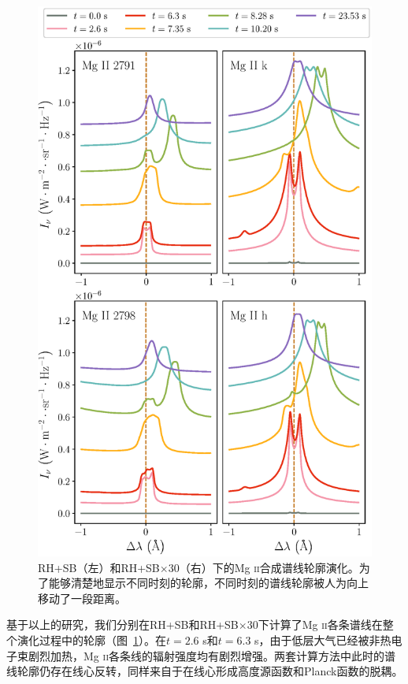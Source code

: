 \begin{figure}[htbp]
\begin{minipage}[t]{0.48\linewidth}
	\includegraphics[width=0.95\linewidth]{figs/5F11_spectra_2_mg}
	\end{minipage}
	\caption{RH+SB（左）和RH+SB$\times30$（右）下的Mg \textsc{ii}合成谱线轮廓演化。为了能够清楚地显示不同时刻的轮廓，不同时刻的谱线轮廓被人为向上移动了一段距离。}
	\label{fig:3.4}
\end{figure}


基于以上的研究，我们分别在RH+SB和RH+SB$\times30$下计算了Mg \textsc{ii}各条谱线在整个演化过程中的轮廓（图~\ref{fig:3.4}）。在$t=2.6$ s和$t=6.3$ s，由于低层大气已经被非热电子束剧烈加热，Mg \textsc{ii}各条线的辐射强度均有剧烈增强。两套计算方法中此时的谱线轮廓仍存在线心反转，同样来自于在线心形成高度源函数和Planck函数的脱耦\parencites{Rubio2016}。

